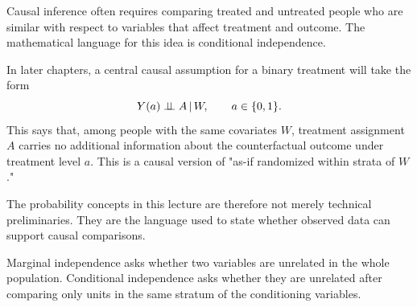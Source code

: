 Causal inference often requires comparing treated and untreated people who are similar with respect to variables that affect treatment and outcome. The mathematical language for this idea is conditional independence.

In later chapters, a central causal assumption for a binary treatment will take the form
\[
Y(a)\perp\!\!\!\perp A\,\vert\, W,
\qquad a\in\{0,1\}.
\]
This says that, among people with the same covariates $W$, treatment assignment $A$ carries no additional information about the counterfactual outcome under treatment level $a$. This is a causal version of "as-if randomized within strata of $W$."

The probability concepts in this lecture are therefore not merely technical preliminaries. They are the language used to state whether observed data can support causal comparisons.

\begin{keyidea}
Marginal independence asks whether two variables are unrelated in the whole population. Conditional independence asks whether they are unrelated after comparing only units in the same stratum of the conditioning variables.
\end{keyidea}
